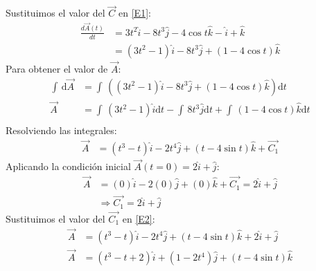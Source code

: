 \documentclass[12pt,openany]{book}
\begin{document}
				Sustituimos el valor del $\vec{C}$ en \ref{E1}:
				\begin{equation*}
					\begin{split}
						\frac{d\vec{A}(t)}{dt}&=3t^{2}\hat{i}-8t^{3}\hat{j}-4\cos t\hat{k}-\hat{i}+\hat{k}	\\
											  &=(3t^{2}-1)\hat{i}-8t^{3}\hat{j}+(1-4\cos t)\hat{k}
					\end{split}
				\end{equation*}
				Para obtener el valor de $\vec{A}$:
				\begin{equation*}
					\begin{split}
						\int\,\mathrm{d}\vec{A}&=\int\,\left((3t^{2}-1)\hat{i}-8t^{3}\hat{j}+(1-4\cos t)\hat{k}\right)\mathrm{d}t \\
									    \vec{A}&=\int\,(3t^{2}-1)\hat{i}\mathrm{d}t-\int\,8t^{3}\hat{j}\mathrm{d}t
											    +\int\,(1-4\cos t)\hat{k}\mathrm{d}t 											  \\
					\end{split}
				\end{equation*}
				Resolviendo las integrales:
				\begin{equation}
					\begin{split}
						\vec{A}&=(t^{3}-t)\hat{i}-2t^{4}\hat{j}+(t-4\sin t)\hat{k}+\vec{C_{1}}
					\end{split}
					\label{E2}
				\end{equation}
				Aplicando la condici\'on inicial $\vec{A}(t=0)=2\hat{i}+\hat{j}$:
				\begin{equation*}
					\begin{split}
						\vec{A}&=(0)\hat{i}-2(0)\hat{j}+(0)\hat{k}+\vec{C_{1}}=2\hat{i}+\hat{j}		\\
							   &\Rightarrow\vec{C_{1}}=2\hat{i}+\hat{j}
					\end{split}
				\end{equation*}
				Sustituimos el valor del $\vec{C_{1}}$ en \ref{E2}:
				\begin{equation*}
					\begin{split}
						\vec{A}&=(t^{3}-t)\hat{i}-2t^{4}\hat{j}+(t-4\sin t)\hat{k}+2\hat{i}+\hat{j}	\\
						\vec{A}&=(t^{3}-t+2)\hat{i}+(1-2t^{4})\hat{j}+(t-4\sin t)\hat{k}
					\end{split}
				\end{equation*}
\end{document}
